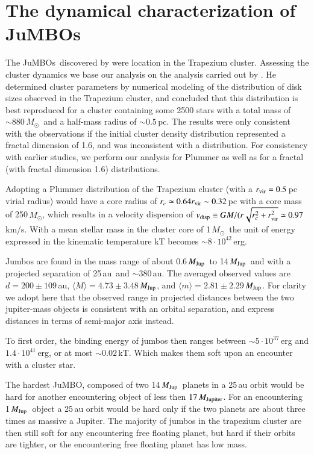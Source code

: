 \documentclass[aa]{lib/aa}
\newcommand{\MSun}{\mbox{${M}_\odot$}}
\newcommand{\MJup}{\mbox{${M}_{\rm Jup}$}}
\newcommand{\jumbo}{\mbox{JuMBO}}
\newcommand{\jumbos}{\mbox{JuMBOs}}
\begin{document}
\section{The dynamical characterization of \jumbos}

The \jumbos\, discovered by \cite{2023arXiv231001231P} were location
in the Trapezium cluster. Assessing the cluster dynamics we base our
analysis on the analysis carried out by \cite{2016MNRAS.457..313P}.
He determined cluster parameters by numerical modeling of the
distribution of disk sizes observed in the Trapezium cluster, and
concluded that this distribution is best reproduced for a cluster
containing some 2500 stars with a total mass of $\sim 880$\,\MSun\,
and a half-mass radius of $\sim 0.5$\,pc. The results were only
consistent with the observations if the initial cluster density
distribution represented a fractal dimension of 1.6, and was
inconsistent with a \cite{1911MNRAS..71..460P} distribution.  For
consistency with earlier studies, we perform our analysis for Plummer
as well as for a fractal (with fractal dimension 1.6) distributions.

Adopting a Plummer distribution of the Trapezium cluster (with a
$r_{\rm vir} = 0.5$\,pc virial radius) would have a core radius of
$r_c \simeq 0.64r_{\rm vir} \sim 0.32$\,pc with a core mass of
250\,\MSun, which results in a velocity dispersion of $v_{\rm disp}
\equiv GM/(r\sqrt{r_c^2 + r_{\rm vir}^2} \simeq 0.97$\,km/s. With a
mean stellar mass in the cluster core of 1\,\MSun\, the unit of energy
expressed in the kinematic temperature kT becomes $\sim 8 \cdot
10^{42}$\,erg.

Jumbos are found in the mass range of about 0.6\,\MJup\, to
14\,\MJup\, and with a projected separation of 25\,au\, and $\sim
380$\,au.  The averaged observed values are $d=200\pm109$\,au,
$\langle M\rangle = 4.73\pm3.48$\,\MJup, and $\langle m\rangle =
2.81\pm2.29$\,\MJup.  For clarity we adopt here that the observed
range in projected distances between the two jupiter-mass objects is
consistent with an orbital separation, and express distances in terms
of semi-major axis instead.

To first order, the binding energy of jumbos then ranges between $\sim
5\cdot 10^{37}$\,erg and $1.4\cdot 10^{41}$\,erg, or at most $\sim
0.02$\,kT. Which makes them soft upon an encounter with a cluster
star.

The hardest \jumbo, composed of two 14\,\MJup\, planets in a 25\,au
orbit would be hard for another encountering object of less then
$17\,M_{\rm Jupiter}$.  For an encountering 1\,\MJup\, object a 25\,au
orbit would be hard only if the two planets are about three times as
massive a Jupiter.  The majority of jumbos in the trapezium cluster
are then still soft for any encountering free floating planet, but
hard if their orbits are tighter, or the encountering free floating
planet has low mass.
\end{document}
